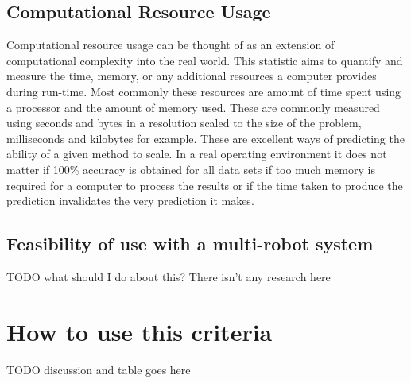   \subsection{ Computational Resource Usage }
  Computational resource usage can be thought of as an extension of computational
  complexity into the real world. This statistic aims to quantify and measure
  the time, memory, or any additional resources a computer provides during run-time.
  Most commonly these resources are amount of time spent using a processor
  and the amount of memory used. These are commonly measured using seconds and
  bytes in a resolution scaled to the size of the problem,  milliseconds
  and kilobytes for example. These are excellent ways of predicting the ability
  of a given method to scale. In a real operating environment it does not matter
  if 100\% accuracy is obtained for all data sets if too much memory is required
  for a computer to process the results or if the time taken to
  produce the prediction invalidates the very prediction it makes.


  \subsection{ Feasibility of use with a multi-robot system }
  TODO what should I do about this? There isn't any research here


  \section{ How to use this criteria }
  TODO discussion and table goes here





